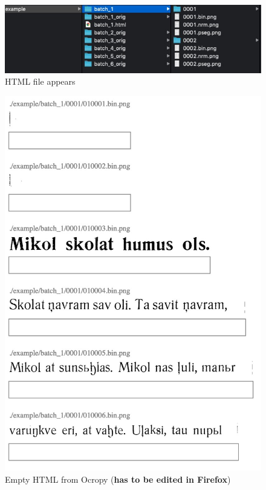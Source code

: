 \documentclass[]{book}
\begin{document}
\begin{figure}
\centering
\includegraphics{./images/ocropy_created_html.jpg}
\caption{HTML file appears}
\end{figure}

\begin{figure}
\centering
\includegraphics{./images/ocropy_empty_html.jpg}
\caption{Empty HTML from Ocropy (\textbf{has to be edited in Firefox})}
\end{figure}
\end{document}
